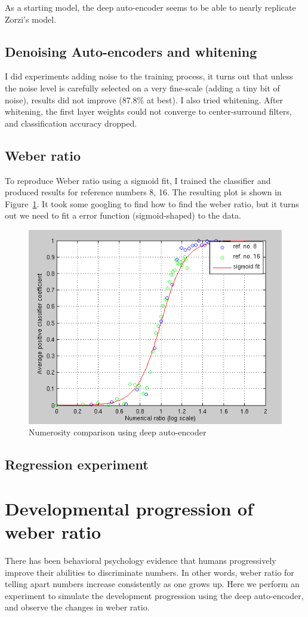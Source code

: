 \documentclass[10pt]{article}
\begin{document}
As a starting model, the deep auto-encoder seems to be able to nearly replicate Zorzi's model. 
\subsection{Denoising Auto-encoders and whitening}
I did experiments adding noise to the training process, it turns out that unless the noise level is carefully selected on a very fine-scale (adding a tiny bit of noise), results did not improve (87.8\% at best). I also tried whitening. After whitening, the first layer weights could not converge to center-surround filters, and classification accuracy dropped. 

\subsection{Weber ratio}
To reproduce Weber ratio using a sigmoid fit, I trained the classifier and produced results for reference numbers 8, 16. The resulting plot is shown in Figure~\ref{fig:w_fit}. It took some googling to find how to find the weber ratio, but it turns out we need to fit a error function (sigmoid-shaped) to the data. 

\begin{figure}[tbh]
\centering
\includegraphics[width=0.5\columnwidth]{eps/w_fit}
\caption{Numerosity comparison using deep auto-encoder}
\label{fig:w_fit}
\vspace{-0.3cm}
\end{figure}

\subsection{Regression experiment}

\section{Developmental progression of weber ratio}
There has been behavioral psychology evidence that humans progressively improve their abilities to discriminate numbers. In other words, weber ratio for telling apart numbers increase consistently as one grows up. Here we perform an experiment to simulate the development progression using the deep auto-encoder, and observe the changes in weber ratio.
\end{document}
